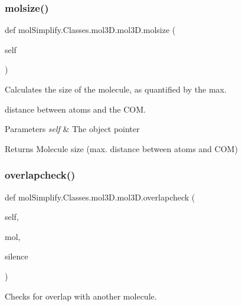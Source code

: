 \subsubsection{\texorpdfstring{molsize()}{molsize()}}
{\footnotesize\ttfamily def mol\+Simplify.\+Classes.\+mol3\+D.\+mol3\+D.\+molsize (\begin{DoxyParamCaption}\item[{}]{self }\end{DoxyParamCaption})}



Calculates the size of the molecule, as quantified by the max. 

distance between atoms and the C\+OM. 
\begin{DoxyParams}{Parameters}
{\em self} & The object pointer \\
\hline
\end{DoxyParams}
\begin{DoxyReturn}{Returns}
Molecule size (max. distance between atoms and C\+OM) 
\end{DoxyReturn}
\mbox{\label{classmolSimplify_1_1Classes_1_1mol3D_1_1mol3D_aab1e703e70f941dfc764a47dfdd6a121}} 
\subsubsection{\texorpdfstring{overlapcheck()}{overlapcheck()}}
{\footnotesize\ttfamily def mol\+Simplify.\+Classes.\+mol3\+D.\+mol3\+D.\+overlapcheck (\begin{DoxyParamCaption}\item[{}]{self,  }\item[{}]{mol,  }\item[{}]{silence }\end{DoxyParamCaption})}



Checks for overlap with another molecule. 

